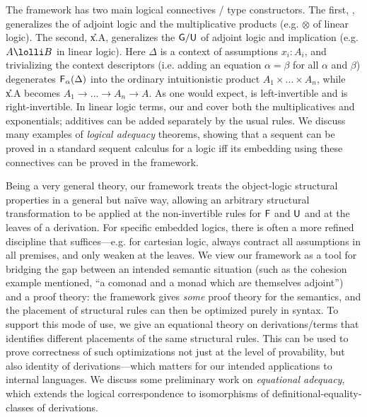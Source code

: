 The framework has two main logical connectives / type constructors.  The
first, \F{\alpha}{\Delta}, generalizes the  of adjoint logic and
the multiplicative products (e.g. $\otimes$ of linear logic).  The
second, \U{x.\alpha}{\Delta}{A}, generalizes the $\mathsf{G}/\mathsf{U}$ of
adjoint logic and implication (e.g. $A \lolli B$ in linear logic).  Here
$\Delta$ is a context of assumptions $x_i:A_i$, and trivializing the
context descriptors (i.e. adding an equation $\alpha = \beta$ for all
$\alpha$ and $\beta$) degenerates $\mathsf{F}_{\alpha}(\Delta)$ into the ordinary
intuitionistic product $A_1 \times \ldots \times A_n$, while
\U{x.\alpha}{\Delta}{A} becomes $A_1 \to \ldots \to A_n \to A$.  
As one would expect,  is left-invertible and  is right-invertible.
In linear logic terms, our  and  cover both the
multiplicatives and exponentials; additives can be added separately by
the usual rules.  We discuss many examples of \emph{logical adequacy}
theorems, showing that a sequent can be proved in a standard sequent
calculus for a logic iff its embedding using these connectives can be
proved in the framework.


Being a very general theory, our framework treats the object-logic
structural properties in a general but na\"ive way, allowing an
arbitrary structural transformation to be applied at the non-invertible
rules for $\mathsf{F}$ and $\mathsf{U}$ and at the leaves of a derivation.
For specific embedded logics, there is often a more refined discipline
that suffices---e.g. for cartesian logic, always contract all
assumptions in all premises, and only weaken at the leaves.  We view our
framework as a tool for bridging the gap between an intended semantic
situation (such as the cohesion example mentioned, ``a comonad and a
monad which are themselves adjoint'') and a proof theory: the framework
gives \emph{some} proof theory for the semantics, and the placement of
structural rules can then be optimized purely in syntax.  To support
this mode of use, we give an equational theory on derivations/terms
that identifies different placements of the same structural rules.  This
can be used to prove correctness of such optimizations not just at the
level of provability, but also identity of derivations---which matters
for our intended applications to internal languages.  We discuss some
preliminary work on \emph{equational adequacy}, which extends the
logical correspondence to isomorphisms of definitional-equality-classes
of derivations.

